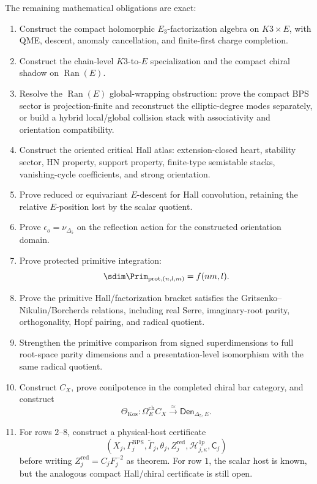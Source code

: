 The remaining mathematical obligations are exact:
\begin{enumerate}
\item Construct the compact holomorphic \(E_3\)-factorization algebra on
\(K3\times E\), with QME, descent, anomaly cancellation, and
finite-first charge completion.
\item Construct the chain-level \(K3\)-to-\(E\) specialization and the
compact chiral shadow on \(\operatorname{Ran}(E)\).
\item Resolve the \(\operatorname{Ran}(E)\) global-wrapping obstruction:
prove the compact BPS sector is projection-finite and reconstruct the
elliptic-degree modes separately, or build a hybrid local/global
collision stack with associativity and orientation compatibility.
\item Construct the oriented critical Hall atlas: extension-closed
heart, stability sector, HN property, support property, finite-type
semistable stacks, vanishing-cycle coefficients, and strong orientation.
\item Prove reduced or equivariant \(E\)-descent for Hall convolution,
retaining the relative \(E\)-position lost by the scalar quotient.
\item Prove \(\epsilon_o=\nu_{\Delta_5}\) on the reflection action for
the constructed orientation domain.
\item Prove protected primitive integration:
\[
\sdim\Prim_{\mathrm{prot},(n,l,m)}=f(nm,l).
\]
\item Prove the primitive Hall/factorization bracket satisfies the
Gritsenko--Nikulin/Borcherds relations, including real Serre,
imaginary-root parity, orthogonality, Hopf pairing, and radical
quotient.
\item Strengthen the primitive comparison from signed superdimensions to
full root-space parity dimensions and a presentation-level isomorphism
with the same radical quotient.
\item Construct \(C_X\), prove conilpotence in the completed chiral bar
category, and construct
\[
\Theta_{\mathrm{Kos}}:\Omega_E^{\mathrm{ch}}C_X
\xrightarrow{\simeq}
\mathsf{Den}_{\Delta_5,E}.
\]
\item For rows \(2\)--\(8\), construct a physical-host certificate
\[
(X_j,\Gamma_j^{\mathrm{BPS}},\widetilde\Gamma_j,\theta_j,
Z_j^{\mathrm{red}},\mathcal H^{1p}_{j,\kappa},\mathsf C_j)
\]
before writing \(Z_j^{\mathrm{red}}=C_jF_j^{-2}\) as theorem.  For row
\(1\), the scalar host is known, but the analogous compact Hall/chiral
certificate is still open.
\end{enumerate}

